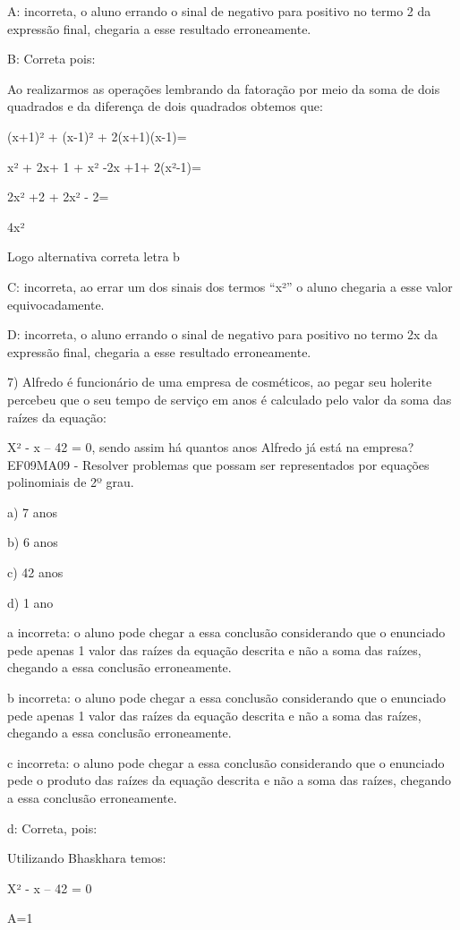 {A: incorreta, o aluno errando o sinal de negativo para positivo no termo
2 da expressão final, chegaria a esse resultado erroneamente.

B: Correta pois:

Ao realizarmos as operações lembrando da fatoração por meio da soma de
dois quadrados e da diferença de dois quadrados obtemos que:

(x+1)² + (x-1)² + 2(x+1)(x-1)=

x² + 2x+ 1 + x² -2x +1+ 2(x²-1)=

2x² +2 + 2x² - 2=

4x²

Logo alternativa correta letra b

C: incorreta, ao errar um dos sinais dos termos ``x²'' o aluno chegaria
a esse valor equivocadamente.

D: incorreta, o aluno errando o sinal de negativo para positivo no termo
2x da expressão final, chegaria a esse resultado erroneamente.

7) Alfredo é funcionário de uma empresa de cosméticos, ao pegar seu
holerite percebeu que o seu tempo de serviço em anos é calculado pelo
valor da soma das raízes da equação:

X² - x -- 42 = 0, sendo assim há quantos anos Alfredo já está na
empresa? EF09MA09 - Resolver problemas que possam ser representados por
equações polinomiais de 2º grau.

a) 7 anos

b) 6 anos

c) 42 anos

d) 1 ano

a incorreta: o aluno pode chegar a essa conclusão considerando que o
enunciado pede apenas 1 valor das raízes da equação descrita e não a
soma das raízes, chegando a essa conclusão erroneamente.

b incorreta: o aluno pode chegar a essa conclusão considerando que o
enunciado pede apenas 1 valor das raízes da equação descrita e não a
soma das raízes, chegando a essa conclusão erroneamente.

c incorreta: o aluno pode chegar a essa conclusão considerando que o
enunciado pede o produto das raízes da equação descrita e não a soma das
raízes, chegando a essa conclusão erroneamente.

d: Correta, pois:

Utilizando Bhaskhara temos:

X² - x -- 42 = 0

A=1

}
